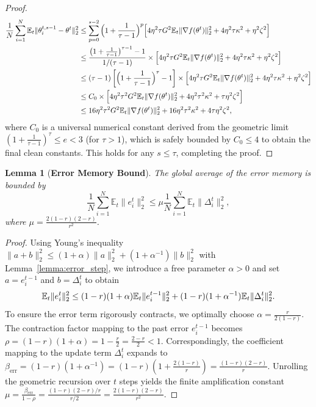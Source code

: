 \documentclass[conference]{IEEEtran}
\newtheorem{lemma}{Lemma}
\begin{document}
\begin{proof}
\begin{align}
    \frac{1}{N}\sum_{i=1}^N \mathbb{E}_t\|\theta_i^{t,s-1} - \theta^t\|_2^2 &\le \sum_{p=0}^{s-2} \Big(1+\frac{1}{\tau-1}\Big)^p \Big[ 4\eta^2\tau G^2\mathbb{E}_t\|\nabla f(\theta^t)\|_2^2 + 4\eta^2\tau\kappa^2 + \eta^2\zeta^2 \Big] \notag \\
    &\le \frac{\big(1+\frac{1}{\tau-1}\big)^{\tau-1} - 1}{1/(\tau-1)} \times \Big[ 4\eta^2\tau G^2\mathbb{E}_t\|\nabla f(\theta^t)\|_2^2 + 4\eta^2\tau\kappa^2 + \eta^2\zeta^2 \Big] \notag \\
    &\le (\tau-1) \left[ \Big(1+\frac{1}{\tau-1}\Big)^{\tau} - 1 \right] \times \Big[ 4\eta^2\tau G^2\mathbb{E}_t\|\nabla f(\theta^t)\|_2^2 + 4\eta^2\tau\kappa^2 + \eta^2\zeta^2 \Big] \notag \\
    &\le C_0 \times \Big[ 4\eta^2\tau^2 G^2\mathbb{E}_t\|\nabla f(\theta^t)\|_2^2 + 4\eta^2\tau^2\kappa^2 + \tau\eta^2\zeta^2 \Big] \notag \\
    &\le 16\eta^2\tau^2 G^2\mathbb{E}_t\|\nabla f(\theta^t)\|_2^2 + 16\eta^2\tau^2\kappa^2 + 4\tau\eta^2\zeta^2,
\end{align}
where $C_0$ is a universal numerical constant derived from the geometric limit $(1 + \frac{1}{\tau-1})^\tau \le e < 3$ (for $\tau > 1$), which is safely bounded by $C_0 \le 4$ to obtain the final clean constants. This holds for any $s \le \tau$, completing the proof.
\end{proof}

\begin{lemma}[\bf Error Memory Bound] \label{lemma:error_bound}
The global average of the error memory is bounded by
\begin{equation}
    \frac{1}{N} \sum_{i=1}^N \mathbb{E}_t \|e_i^t\|_2^2 \le \mu \frac{1}{N} \sum_{i=1}^N \mathbb{E}_t \|\Delta_i^t\|_2^2,
\end{equation}
where $\mu = \frac{2(1-r)(2-r)}{r^2}$.
\end{lemma}
\begin{proof}
Using Young's inequality $\|a + b\|_2^2 \le (1 + \alpha) \|a\|_2^2 + (1 + \alpha^{-1}) \|b\|_2^2$ with Lemma~\ref{lemma:error_step}, we introduce a free parameter $\alpha > 0$ and set $a = e_i^{t-1}$ and $b = \Delta_i^t$ to obtain
\begin{equation}
    \mathbb{E}_t\|e_i^t\|_2^2 \le (1-r)(1+\alpha)\mathbb{E}_t\|e_i^{t-1}\|_2^2 + (1-r)(1+\alpha^{-1})\mathbb{E}_t\|\Delta_i^t\|_2^2. \notag
\end{equation}
To ensure the error term rigorously contracts, we optimally choose $\alpha = \frac{r}{2(1-r)}$. The contraction factor mapping to the past error $e_i^{t-1}$ becomes $\rho = (1-r)(1+\alpha) = 1 - \frac{r}{2} = \frac{2-r}{2} < 1$. 
Correspondingly, the coefficient mapping to the update term $\Delta_i^t$ expands to $\beta_{\mathrm{err}} = (1-r)(1+\alpha^{-1}) = (1-r)\left(1+\frac{2(1-r)}{r}\right) = \frac{(1-r)(2-r)}{r}$.
Unrolling the geometric recursion over $t$ steps yields the finite amplification constant $\mu = \frac{\beta_{\mathrm{err}}}{1-\rho} = \frac{(1-r)(2-r)/r}{r/2} = \frac{2(1-r)(2-r)}{r^2}$.
\end{proof}
\end{document}
